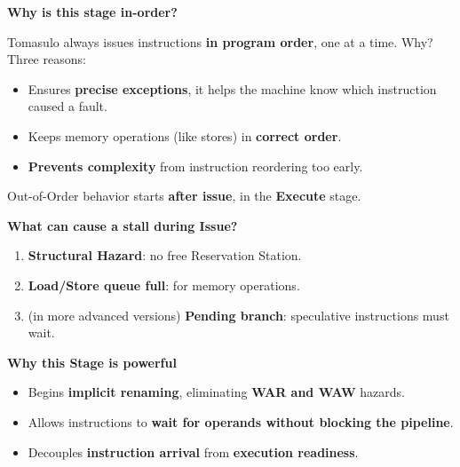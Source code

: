 \highspace
\begin{flushleft}
    \textcolor{Green3}{ \textbf{Why is this stage in-order?}}
\end{flushleft}
Tomasulo always issues instructions \textbf{in program order}, one at a time. Why? Three reasons:
\begin{itemize}
    \item Ensures \textbf{precise exceptions}, it helps the machine know which instruction caused a fault.
    \item Keeps memory operations (like stores) in \textbf{correct order}.
    \item \textbf{Prevents complexity} from instruction reordering too early.
\end{itemize}
Out-of-Order behavior starts \textbf{after issue}, in the \textbf{Execute} stage.

\newpage

\begin{flushleft}
    \textcolor{Red2}{ \textbf{What can cause a stall during Issue?}}
\end{flushleft}
\begin{enumerate}
    \item \textbf{Structural Hazard}: no free Reservation Station.
    \item \textbf{Load/Store queue full}: for memory operations.
    \item (in more advanced versions) \textbf{Pending branch}: speculative instructions must wait.
\end{enumerate}

\begin{flushleft}
    \textcolor{Green3}{ \textbf{Why this Stage is powerful}}
\end{flushleft}
\begin{itemize}
    \item Begins \textbf{implicit renaming}, eliminating \textbf{WAR and WAW} hazards.
    \item Allows instructions to \textbf{wait for operands without blocking the pipeline}.
    \item Decouples \textbf{instruction arrival} from \textbf{execution readiness}.
\end{itemize}

